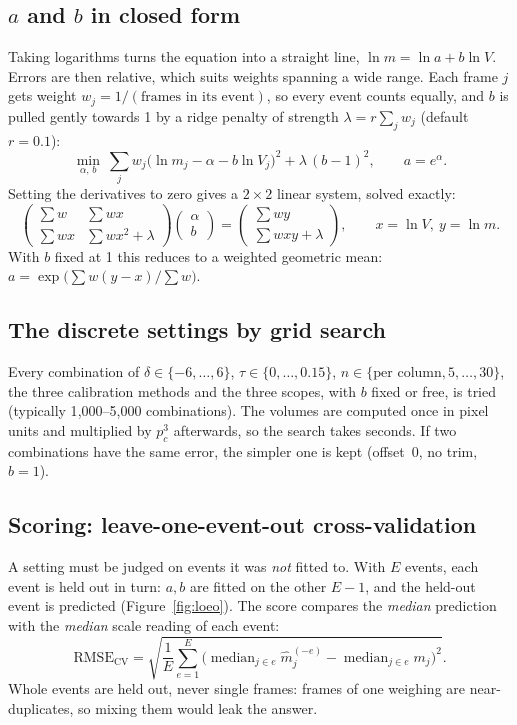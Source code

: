 \documentclass[11pt,a4paper]{article}
\begin{document}
\subsection{$a$ and $b$ in closed form}
Taking logarithms turns the equation into a straight line, $\ln m = \ln a + b\ln V$. Errors are then relative, which suits weights spanning a wide range. Each frame $j$ gets weight $w_j = 1/(\text{frames in its event})$, so every event counts equally, and $b$ is pulled gently towards 1 by a ridge penalty of strength $\lambda=r\sum_j w_j$ (default $r=0.1$):
\begin{equation}
  \min_{\alpha,\,b}\ \sum_j w_j\big(\ln m_j-\alpha-b\ln V_j\big)^{2}+\lambda\,(b-1)^{2},\qquad a=e^{\alpha}.
\end{equation}
Setting the derivatives to zero gives a $2\times2$ linear system, solved exactly:
\begin{equation}
\begin{pmatrix}\sum w & \sum w x\\ \sum w x & \sum w x^{2}+\lambda\end{pmatrix}
\begin{pmatrix}\alpha\\ b\end{pmatrix}=
\begin{pmatrix}\sum w y\\ \sum w x y+\lambda\end{pmatrix},\qquad x=\ln V,\ y=\ln m.
\end{equation}
With $b$ fixed at 1 this reduces to a weighted geometric mean: $a=\exp\!\big(\sum w(y-x)/\sum w\big)$.

\subsection{The discrete settings by grid search}
Every combination of $\delta\in\{-6,\dots,6\}$, $\tau\in\{0,\dots,0.15\}$, $n\in\{\text{per column},5,\dots,30\}$, the three calibration methods and the three scopes, with $b$ fixed or free, is tried (typically 1{,}000--5{,}000 combinations). The volumes are computed once in pixel units and multiplied by $p_c^3$ afterwards, so the search takes seconds. If two combinations have the same error, the simpler one is kept (offset~0, no trim, $b=1$).

\subsection{Scoring: leave-one-event-out cross-validation}
A setting must be judged on events it was \emph{not} fitted to. With $E$ events, each event is held out in turn: $a,b$ are fitted on the other $E-1$, and the held-out event is predicted (Figure~\ref{fig:loeo}). The score compares the \emph{median} prediction with the \emph{median} scale reading of each event:
\begin{equation}
  \text{RMSE}_{\text{CV}}=\sqrt{\frac{1}{E}\sum_{e=1}^{E}\Big(\operatorname{median}_{j\in e}\hat m_j^{(-e)}-\operatorname{median}_{j\in e}m_j\Big)^{2}}.
\end{equation}
Whole events are held out, never single frames: frames of one weighing are near-duplicates, so mixing them would leak the answer.
\end{document}
